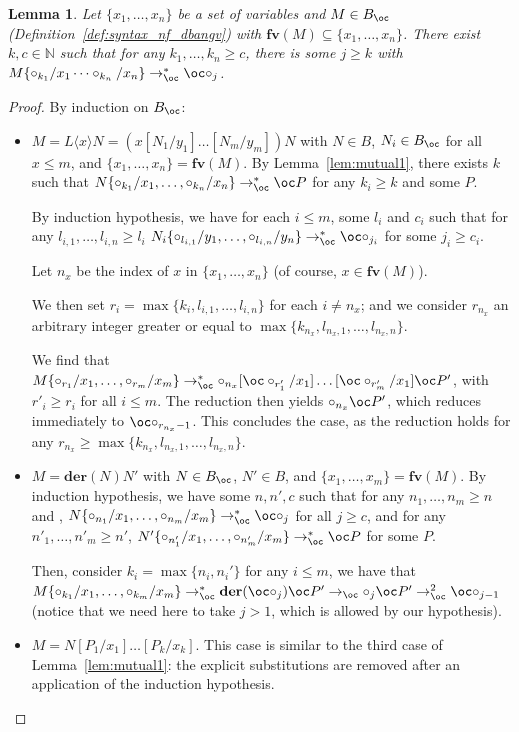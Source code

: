 \documentclass[10pt,a4paper]{article}
\newtheorem{lemma}[theorem]{Lemma}
\newcommand{\<}{\langle}
\renewcommand{\>}{\rangle}
\newcommand{\der}[1]{\ensuremath{\mathbf{der}(#1)}}
\newcommand{\fv}{\mathbf{fv}}
\newcommand{\todbf}{\to_{\oc}} %
\begin{document}
\begin{lemma}
\label{lem:mutual2}
	Let $\{x_1,\dots ,x_n\}$ be a set of variables and $M\in B_\oc$
	(Definition~\ref{def:syntax_nf_dbangv}) with
	$\fv(M)\subseteq\{x_1,\dots ,x_n\}$. There exist $k,c\in\mathbb N$ such
	that for any $k_1,\dots ,k_n\geq c$, there is some $j\geq k$ with
	$M\{\circ_{k_1}/x_1\dots \circ_{k_n}/x_n\}\todbf^* \oc \circ_j$. 
\end{lemma}
\begin{proof}
	By induction on $B_\oc$:
	\begin{itemize}
		\item $M=L\<x\>N=(x[N_1/y_1]\dots [N_m/y_m])N$ with $N\in B$, $N_i\in
			B_\oc$ for all $x\leq m$, and $\{x_1,\dots ,x_n\}=\fv(M)$. By
			Lemma~\ref{lem:mutual1}, there
			exists $k$ such that
			$N\{\circ_{k_1}/x_1,\dots ,\circ_{k_n}/x_n\}\todbf^* \oc P$ for
			any $k_i\geq k$ and some $P$. 
			
			By induction hypothesis, we have for each $i\leq m$,
			some $l_i$ and $c_i$ such that for any $l_{i,1},\dots ,l_{i,n}\geq l_i$
			$N_i \{\circ_{l_{i,1}}/y_1,\dots ,\circ_{l_{i,n}}/y_n\}\todbf^*
			\oc\circ_{j_i}$ for some $j_i\geq c_i$.

			Let $n_x$ be the index of $x$ in
			$\{x_1,\dots ,x_n\}$ (of course, $x\in\fv(M)$).

			We then
			set $r_i=\max\{k_i,
			l_{i,1},\dots ,l_{i,n}\}$ for each $i\neq n_x$; and we
			consider $r_{n_x}$ an arbitrary integer greater or equal
			to $\max\{k_{n_x},l_{n_x,1},\dots ,l_{n_x,n}\}$.
			
			We find 
			that $M\{\circ_{r_1}/x_1,\dots ,\circ_{r_m}/x_m\}\todbf^*
			\circ_{n_x}[\oc\circ_{r_1'}/x_1]\dots [\oc\circ_{r_m'}/x_1]\oc
			P'$, with $r'_i\geq
			r_i$ for all $i\leq m$. The reduction then yields 
			$\circ_{n_x}\oc P'$, which reduces immediately to $\oc
			\circ_{r_{n_x}-1}$. This concludes the case, as the
			reduction holds for any
			$r_{n_x}\geq\max\{k_{n_x},l_{n_x,1},\dots ,l_{n_x,n}\}$.
			
		\item $M=\der N N'$ with $N\in B_\oc$, $N'\in B$, and
			$\{x_1,\dots ,x_m\}=\fv(M)$. By induction
			hypothesis, we have some $n, n',c$ such that for any
			$n_1,\dots ,n_m\geq n$ and ,
			$N\{\circ_{n_1}/x_1,\dots ,\circ_{n_m}/x_m\}\todbf^*\oc\circ_j$ for
			all $j\geq c$, and for any $n'_1,\dots ,n'_m\geq n'$,
			$N'\{\circ_{n'_1}/x_1,\dots ,\circ_{n'_m}/x_m\}\todbf^*\oc P$
			for some $P$.

			Then, consider $k_i=\max\{n_i,n_i'\}$ for any $i\leq m$,
			we have that
			$M\{\circ_{k_1}/x_1,\dots ,\circ_{k_m}/x_m\}\todbf^* \der{\oc
			\circ_j}\oc P'\todbf \circ_j\oc P'\todbf^2\oc\circ_{j-1}$
			(notice that we need here to take $j>1$, which is
			allowed by our hypothesis).
		\item $M=N[P_1/x_1]\dots [P_k/x_k]$. This case is similar to the third case of
			Lemma~\ref{lem:mutual1}: the explicit substitutions are
			removed after an application of the induction
			hypothesis. \qedhere
	\end{itemize}
\end{proof}
\end{document}
